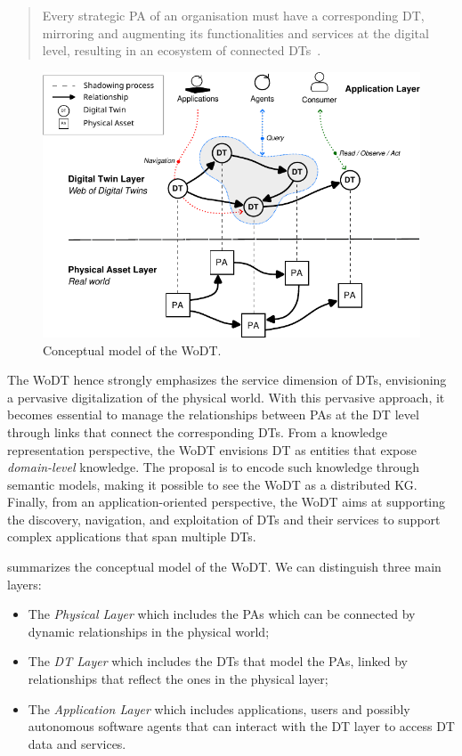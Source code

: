 \begin{quote}
Every strategic \acl{PA} of an organisation must have a corresponding \acl{DT}, mirroring and augmenting its functionalities and services at the digital level, resulting in an ecosystem of connected \aclp{DT}~\cite{web-of-dt-ricci-2022}.
\end{quote}

\begin{figure}[t]
    \centering
    \includegraphics[width=\textwidth]{figures/wodt.pdf}
    \caption{Conceptual model of the \acl{WoDT}.}
    \label{fig:dt-wodt-model}
\end{figure}

The \ac{WoDT} hence strongly emphasizes the service dimension of \acp{DT}, envisioning a pervasive digitalization of the physical world.
%
With this pervasive approach, it becomes essential to manage the relationships between \acp{PA} at the \ac{DT} level through links that connect the corresponding \acp{DT}.
%
From a knowledge representation perspective, the \ac{WoDT} envisions \ac{DT} as entities that expose \emph{domain-level} knowledge.
%
The proposal is to encode such knowledge through semantic models, making it possible to see the \ac{WoDT} as a distributed \ac{KG}.
%
Finally, from an application-oriented perspective, the \ac{WoDT} aims at supporting the discovery, navigation, and exploitation of \acp{DT} and their services to support complex applications that span multiple \acp{DT}.

 summarizes the conceptual model of the \ac{WoDT}.
%
We can distinguish three main layers:
\begin{itemize}
    \item The \emph{Physical Layer} which includes the \acp{PA} which can be connected by dynamic relationships in the physical world;
    \item The \emph{\acl{DT} Layer} which includes the \acp{DT} that model the \acp{PA}, linked by relationships that reflect the ones in the physical layer;
    \item The \emph{Application Layer} which includes applications, users and possibly autonomous software agents that can interact with the \ac{DT} layer to access \ac{DT} data and services.
\end{itemize}

